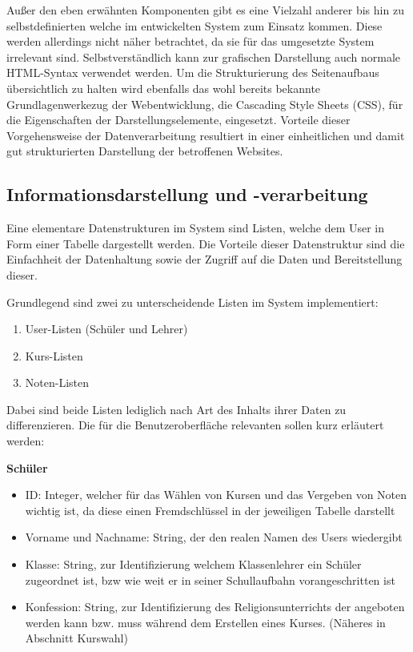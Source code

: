 \documentclass[12pt, twoside, a4paper, ngerman]{article}
\begin{document}
Außer den eben erwähnten Komponenten gibt es eine Vielzahl anderer bis hin zu selbstdefinierten welche im entwickelten System zum Einsatz kommen. Diese werden allerdings nicht näher betrachtet, da sie für das umgesetzte System irrelevant sind. Selbstverständlich kann zur grafischen Darstellung auch normale \ac{HTML}-Syntax verwendet werden.
Um die Strukturierung des Seitenaufbaus übersichtlich zu halten wird ebenfalls das wohl bereits bekannte Grundlagenwerkezug der Webentwicklung, die \gls{Cascading Style Sheets} (CSS), für die Eigenschaften der Darstellungselemente, eingesetzt.
Vorteile dieser Vorgehensweise der Datenverarbeitung resultiert in einer einheitlichen und damit gut strukturierten Darstellung der betroffenen Websites.


\subsection{Informationsdarstellung und -verarbeitung}

Eine elementare Datenstrukturen im System sind Listen, welche dem User in Form einer Tabelle dargestellt werden.
Die Vorteile dieser Datenstruktur sind die Einfachheit der Datenhaltung sowie der Zugriff auf die Daten und Bereitstellung dieser.

Grundlegend sind zwei zu unterscheidende Listen im System implementiert:
\begin{enumerate}
  \item User-Listen (Schüler und Lehrer)
  \item Kurs-Listen
  \item Noten-Listen
\end{enumerate}

Dabei sind beide Listen lediglich nach Art des Inhalts ihrer Daten zu differenzieren. Die für die Benutzeroberfläche relevanten sollen kurz erläutert werden:

\textbf{Schüler}
\begin{itemize}
  \item ID: Integer, welcher für das Wählen von Kursen und das Vergeben von Noten wichtig ist, da diese einen Fremdschlüssel in der jeweiligen Tabelle darstellt
  \item Vorname und Nachname: String, der den realen Namen des Users wiedergibt
  \item Klasse: String, zur Identifizierung welchem Klassenlehrer ein Schüler zugeordnet ist, bzw wie weit er in seiner Schullaufbahn vorangeschritten ist
  \item Konfession: String, zur Identifizierung des Religionsunterrichts der angeboten werden kann bzw. muss während dem Erstellen eines Kurses. (Näheres in Abschnitt Kurswahl)
\end{itemize}
\end{document}
